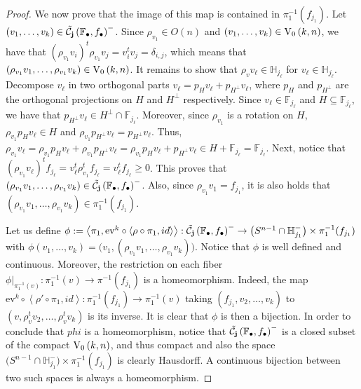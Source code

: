 \begin{proof}
We now prove that the image of this map is contained in $\pi_1^{-1}(f_{j_1})$. Let $(v_1,\ldots,v_k)\in\tilde{\mathcal{C}}_{\mathbf{j}}\left(\mathbb{F}_{\bullet},f_{\bullet}\right)^-$. Since $\rho_{v_1}\in O(n)$ and $(v_1,\ldots,v_k)\in\StO{k}{n}$, we have that $(\rho_{v_1}v_i)^t\rho_{v_1}v_j=v_i^tv_j=\delta_{i,j}$, which means that $(\rho_{v_1}v_1,\ldots,\rho_{v_1}v_k)\in\StO{k}{n}$. It remains to show that $\rho_vv_{\ell}\in\mathbb{H}_{j_{\ell}}$ for $v_{\ell}\in\mathbb{H}_{j_{\ell}}$. Decompose $v_{\ell}$ in two orthogonal parts $v_{\ell}=p_Hv_{\ell}+p_{H^{\perp}}v_{\ell}$, where $p_H$ and $p_{H^{\perp}}$ are the orthogonal projections on $H$ and $H^{\perp}$ respectively. Since $v_{\ell}\in\mathbb{F}_{j_{\ell}}$ and $H\subseteq\mathbb{F}_{j_{\ell}}$, we have that $p_{H^{\perp}}v_{\ell}\in H^{\perp}\cap\mathbb{F}_{j_{\ell}}$. Moreover, since $\rho_{v_1}$ is a rotation on $H$, $\rho_{v_1}p_Hv_{\ell}\in H$ and $\rho_{v_1}p_{H^{\perp}}v_{\ell}=p_{H^{\perp}}v_{\ell}$. Thus, $\rho_{v_1}v_{\ell}=\rho_{v_1}p_Hv_{\ell}+\rho_{v_1}p_{H^{\perp}}v_{\ell}=\rho_{v_1}p_Hv_{\ell}+p_{H^{\perp}}v_{\ell}\in H+\mathbb{F}_{j_{\ell}}=\mathbb{F}_{j_{\ell}}$. Next, notice that $(\rho_{v_1}v_{\ell})^tf_{j_{\ell}}=v_{\ell}^t\rho_{v_1}^tf_{j_{\ell}}=v_{\ell}^tf_{j_{\ell}}\geq0$. This proves that $(\rho_{v_1}v_1,\ldots,\rho_{v_1}v_k)\in\tilde{\mathcal{C}}_{\mathbf{j}}\left(\mathbb{F}_{\bullet},f_{\bullet}\right)^-$. Also, since $\rho_{v_1}v_1=f_{j_1}$, it is also holds that $(\rho_{v_1}v_1,\ldots,\rho_{v_1}v_k)\in\pi_1^{-1}(f_{j_1})$.

Let us define $\phi:=\left<\pi_1,\mathrm{ev}^k\circ\left<\rho\circ\pi_1,id\right>\right>:\tilde{\mathcal{C}}_{\mathbf{j}}\left(\mathbb{F}_{\bullet},f_{\bullet}\right)^-\to\big(S^{n-1}\cap\mathbb{H}_{j_1}^-\big)\times\pi_1^{-1}(f_{j_1})$ with $\phi(v_1,\ldots,v_k)=\big(v_1,(\rho_{v_1}v_1,\ldots,\rho_{v_1}v_k)\big)$. Notice that $\phi$ is well defined and continuous. Moreover, the restriction on each fiber $\phi|_{\pi_1^{-1}(v)}:\pi_1^{-1}(v)\to\pi^{-1}(f_{j_1})$ is a homeomorphism. Indeed, the map $\mathrm{ev}^k\circ\left<\rho'\circ\pi_1{,}id\right>:\pi_1^{-1}(f_{j_1})\to\pi_1^{-1}(v)$ taking $(f_{j_1},v_2,\ldots,v_k)$ to $(v,\rho_v^tv_2,\ldots,\rho_v^tv_k)$ is its inverse. It is clear that $\phi$ is then a bijection. In order to conclude that $phi$ is a homeomorphism, notice that $\tilde{\mathcal{C}}_{\mathbf{j}}\left(\mathbb{F}_{\bullet},f_{\bullet}\right)^-$ is a closed subset of the compact $\StO{k}{n}$, and thus compact and also the space $\big(S^{n-1}\cap\mathbb{H}_{j_1}^-\big)\times\pi_1^{-1}(f_{j_1})$ is clearly Hausdorff. A continuous bijection between two such spaces is always a homeomorphism.
\end{proof}

